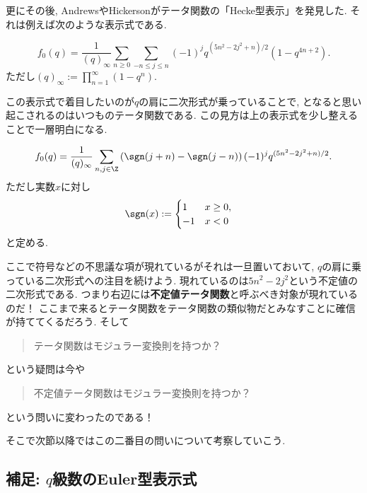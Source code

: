 \documentclass[11pt,b5paper,oneside,lualatex]{ltjsarticle} %
\numberwithin{equation}{section} %
\begin{document}
更にその後, AndrewsやHickersonがテータ関数の「Hecke型表示」を発見した. 
それは例えば次のような表示式である. 

\begin{thm}
	\[
	f_0 (q) = \frac{1}{(q)_\infty}
	\sum_{n \ge 0} \sum_{-n \le j \le n} (-1)^j q^{(5n^2 - 2j^2 + n)/2} (1 - q^{4n+2}).
	\]
	ただし$ (q)_\infty := \prod_{n=1}^{\infty} (1 - q^n) $.
\end{thm}

この表示式で着目したいのが$ q $の肩に二次形式が乗っていることで, となると思い起こされるのはいつものテータ関数である. 
この見方は上の表示式を少し整えることで一層明白になる. 

\begin{cor} \label{cor:mock_indefinite}
	\[
	f_0 (q) = \frac{1}{(q)_\infty}
	\sum_{n, j \in \Z} \left( \sgn(j+n) - \sgn(j-n) \right) (-1)^j q^{(5n^2 - 2j^2 + n)/2}.
	\]	
	ただし実数$ x $に対し
	\begin{align}
		\sgn(x) &:= 
		\begin{cases}
			1 & x \ge 0, \\
			-1 & x < 0
		\end{cases}
	\end{align}
	と定める. 
\end{cor}

ここで符号などの不思議な項が現れているがそれは一旦置いておいて, $ q $の肩に乗っている二次形式への注目を続けよう. 
現れているのは$ 5n^2 - 2j^2 $という不定値の二次形式である. 
つまり右辺には\textbf{不定値テータ関数}と呼ぶべき対象が現れているのだ！
ここまで来るとテータ関数をテータ関数の類似物だとみなすことに確信が持ててくるだろう. 
そして
\begin{quote}
	\centering
	テータ関数はモジュラー変換則を持つか？
\end{quote}
という疑問は今や
\begin{quote}
	\centering
	不定値テータ関数はモジュラー変換則を持つか？
\end{quote}
という問いに変わったのである！

そこで次節以降ではこの二番目の問いについて考察していこう. 


\subsection{補足: $ q $級数のEuler型表示式} \label{subsec:Eulerian_form}
\end{document}
